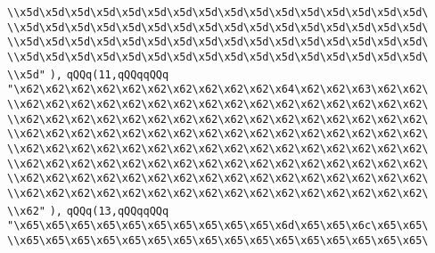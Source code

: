 \verb|\\x5d\x5d\x5d\x5d\x5d\x5d\x5d\x5d\x5d\x5d\x5d\x5d\x5d\x5d\x5d\x5d\|\newline
\verb|\\x5d\x5d\x5d\x5d\x5d\x5d\x5d\x5d\x5d\x5d\x5d\x5d\x5d\x5d\x5d\x5d\|\newline
\verb|\\x5d\x5d\x5d\x5d\x5d\x5d\x5d\x5d\x5d\x5d\x5d\x5d\x5d\x5d\x5d\x5d\|\newline
\verb|\\x5d\x5d\x5d\x5d\x5d\x5d\x5d\x5d\x5d\x5d\x5d\x5d\x5d\x5d\x5d\x5d\|\newline
\verb|\\x5d"|\newline
\verb|),|\newline
\verb|qQQq(11,qQQqqQQq|\newline
\verb|"\x62\x62\x62\x62\x62\x62\x62\x62\x62\x62\x64\x62\x62\x63\x62\x62\|\newline
\verb|\\x62\x62\x62\x62\x62\x62\x62\x62\x62\x62\x62\x62\x62\x62\x62\x62\|\newline
\verb|\\x62\x62\x62\x62\x62\x62\x62\x62\x62\x62\x62\x62\x62\x62\x62\x62\|\newline
\verb|\\x62\x62\x62\x62\x62\x62\x62\x62\x62\x62\x62\x62\x62\x62\x62\x62\|\newline
\verb|\\x62\x62\x62\x62\x62\x62\x62\x62\x62\x62\x62\x62\x62\x62\x62\x62\|\newline
\verb|\\x62\x62\x62\x62\x62\x62\x62\x62\x62\x62\x62\x62\x62\x62\x62\x62\|\newline
\verb|\\x62\x62\x62\x62\x62\x62\x62\x62\x62\x62\x62\x62\x62\x62\x62\x62\|\newline
\verb|\\x62\x62\x62\x62\x62\x62\x62\x62\x62\x62\x62\x62\x62\x62\x62\x62\|\newline
\verb|\\x62"|\newline
\verb|),|\newline
\verb|qQQq(13,qQQqqQQq|\newline
\verb|"\x65\x65\x65\x65\x65\x65\x65\x65\x65\x65\x6d\x65\x65\x6c\x65\x65\|\newline
\verb|\\x65\x65\x65\x65\x65\x65\x65\x65\x65\x65\x65\x65\x65\x65\x65\x65\|\newline
